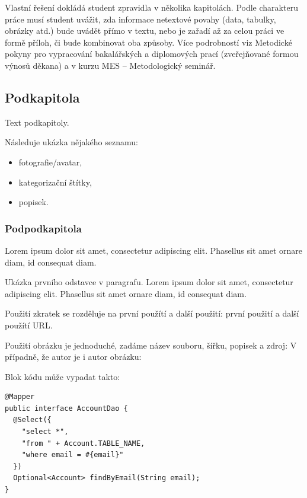 
Vlastní řešení dokládá student zpravidla v několika kapitolách.
Podle charakteru práce musí student uvážit, zda informace
netextové povahy (data, tabulky, obrázky atd.) bude uvádět přímo v textu, nebo je zařadí až za celou práci ve formě příloh, či bude kombinovat oba způsoby.
Více podrobností viz Metodické pokyny pro vypracování bakalářských a diplomových prací (zveřejňované formou výnosů děkana)
a v kurzu MES – Metodologický seminář.

	\subsection{Podkapitola}

	Text podkapitoly.

	Následuje ukázka nějakého seznamu:
	\begin{itemize}
		\item fotografie/avatar,
		\item kategorizační štítky,
		\item popisek.
	\end{itemize}

		\subsubsection{Podpodkapitola}

		Lorem ipsum dolor sit amet, consectetur adipiscing elit. Phasellus sit amet ornare diam, id consequat diam.


			\noindent Ukázka prvního odstavce v paragrafu. Lorem ipsum dolor sit amet, consectetur adipiscing elit. Phasellus sit amet ornare diam, id consequat diam.


			Použití zkratek se rozděluje na první použítí a další použití: první použití  a další použítí \ac{URL}.

			Použití obrázku je jednoduché, zadáme název souboru, šířku, popisek a zdroj:
			V případně, že autor je i autor obrázku:


			Blok kódu může vypadat takto:

			\begin{codeblock}
				\begin{verbatim}
@Mapper
public interface AccountDao {
  @Select({
    "select *",
    "from " + Account.TABLE_NAME,
    "where email = #{email}"
  })
  Optional<Account> findByEmail(String email);
}
				\end{verbatim}
			\end{codeblock}

